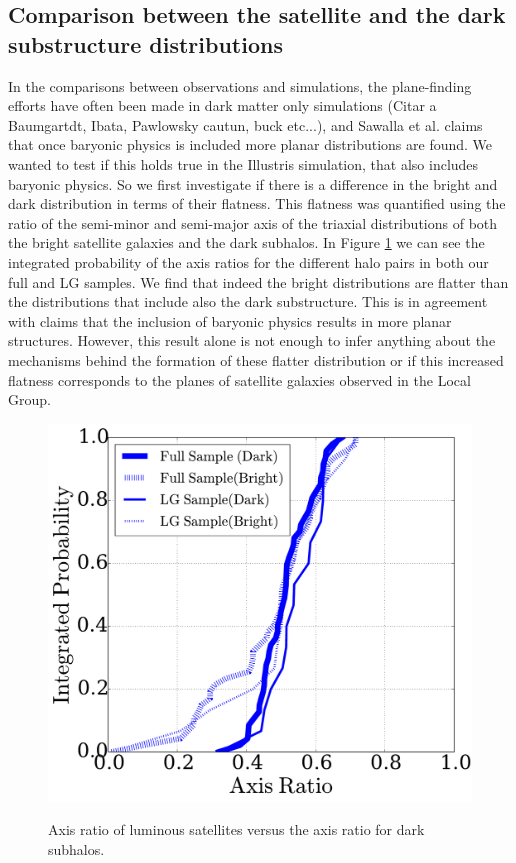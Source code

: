 \subsection{Comparison between the satellite and the dark substructure distributions}
\label{DarkBright}
In the comparisons between observations and simulations, the plane-finding efforts have often been made in dark matter only simulations (Citar a Baumgartdt, Ibata, Pawlowsky cautun, buck etc...), and Sawalla et al. claims that once baryonic physics is included more planar distributions are found.
We wanted to test if this holds true in the Illustris simulation, that also includes baryonic physics. So we first investigate if there is a difference in the bright and dark distribution in terms of their flatness. 
This flatness was quantified using the ratio of the semi-minor and semi-major axis of the triaxial distributions of both the bright satellite galaxies and the dark subhalos. 
In Figure \ref{fig:StreamPlaneOrbit} we can see the integrated probability of the axis ratios for the different halo pairs in both our full and LG samples. 
We find that indeed the bright distributions are flatter than the distributions that include also the dark substructure.
This is in agreement with claims that the inclusion of baryonic physics results in more planar structures. 
However, this result alone is not enough to infer anything about the mechanisms behind the formation of these flatter distribution or if this increased flatness corresponds to the planes of satellite galaxies observed in the Local Group.\\
\begin{figure}
\includegraphics[width=\hsize]{axratio_dark_bright.pdf}\\
\caption{Axis ratio of luminous satellites versus the axis ratio for
  dark subhalos.}
\label{fig:StreamPlaneOrbit}
\end{figure}

